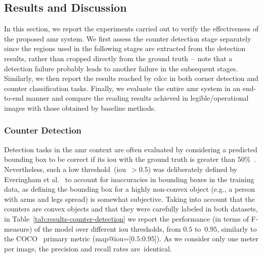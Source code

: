 \subsection{Results and Discussion}

In this section, we report the experiments carried out to verify the effectiveness of the proposed \gls*{amr} system.
We first assess the counter detection stage separately since the regions used in the following stages are extracted from the detection results, rather than cropped directly from the ground truth --~note that a detection failure probably leads to another failure in the subsequent stages.
Similarly, we then report the results reached by \gls*{cdcc} in both corner detection and counter classification tasks.
Finally, we evaluate the entire \gls*{amr} system in an end-to-end manner  and compare the reading results achieved in legible/operational images with those obtained by \numbaselines baseline methods.





\subsubsection{Counter Detection}
\label{sec:results:cd}

Detection tasks in the \gls*{amr} context are often evaluated by considering a predicted bounding box to be correct if its \gls*{iou} with the ground truth is greater than $50$\%~\cite{laroca2019convolutional,salomon2020deep}.
Nevertheless, such a low threshold~(\gls*{iou}~$> 0.5$) was deliberately defined by Everingham et al.~\cite{everingham2010pascalvoc} to account for inaccuracies in bounding boxes in the training data, as defining the bounding box for a highly non-convex object (e.g., a person with arms and legs spread) is somewhat subjective.
Taking into account that the counters are convex objects and that they were carefully labeled in both datasets, in Table~\ref{tab:results-counter-detection} we report the performance (in terms of F-measure) of the \detnet model over different \gls*{iou} thresholds, from $0.5$ to~$0.95$, similarly to the COCO~\cite{lin2014microsoft} primary metric (\gls*{map}@\gls*{iou}=[$0.5$:$0.95$]).
As we consider only one meter per image, the precision and recall rates are~identical.

